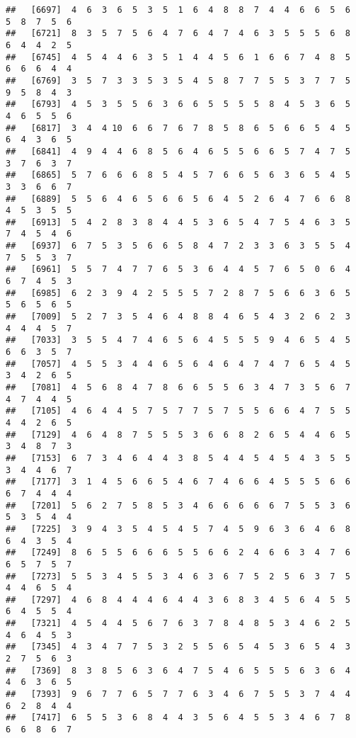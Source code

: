 \documentclass[
]{book}
\begin{document}
\begin{verbatim}
##   [6697]  4  6  3  6  5  3  5  1  6  4  8  8  7  4  4  6  6  5  6  5  8  7  5  6
##   [6721]  8  3  5  7  5  6  4  7  6  4  7  4  6  3  5  5  5  6  8  6  4  4  2  5
##   [6745]  4  5  4  4  6  3  5  1  4  4  5  6  1  6  6  7  4  8  5  6  6  6  4  4
##   [6769]  3  5  7  3  3  5  3  5  4  5  8  7  7  5  5  3  7  7  5  9  5  8  4  3
##   [6793]  4  5  3  5  5  6  3  6  6  5  5  5  5  8  4  5  3  6  5  4  6  5  5  6
##   [6817]  3  4  4 10  6  6  7  6  7  8  5  8  6  5  6  6  5  4  5  6  4  3  6  5
##   [6841]  4  9  4  4  6  8  5  6  4  6  5  5  6  6  5  7  4  7  5  3  7  6  3  7
##   [6865]  5  7  6  6  6  8  5  4  5  7  6  6  5  6  3  6  5  4  5  3  3  6  6  7
##   [6889]  5  5  6  4  6  5  6  6  5  6  4  5  2  6  4  7  6  6  8  4  5  3  5  5
##   [6913]  5  4  2  8  3  8  4  4  5  3  6  5  4  7  5  4  6  3  5  7  4  5  4  6
##   [6937]  6  7  5  3  5  6  6  5  8  4  7  2  3  3  6  3  5  5  4  7  5  5  3  7
##   [6961]  5  5  7  4  7  7  6  5  3  6  4  4  5  7  6  5  0  6  4  6  7  4  5  3
##   [6985]  6  2  3  9  4  2  5  5  5  7  2  8  7  5  6  6  3  6  5  5  6  5  6  5
##   [7009]  5  2  7  3  5  4  6  4  8  8  4  6  5  4  3  2  6  2  3  4  4  4  5  7
##   [7033]  3  5  5  4  7  4  6  5  6  4  5  5  5  9  4  6  5  4  5  6  6  3  5  7
##   [7057]  4  5  5  3  4  4  6  5  6  4  6  4  7  4  7  6  5  4  5  3  4  2  6  5
##   [7081]  4  5  6  8  4  7  8  6  6  5  5  6  3  4  7  3  5  6  7  4  7  4  4  5
##   [7105]  4  6  4  4  5  7  5  7  7  5  7  5  5  6  6  4  7  5  5  4  4  2  6  5
##   [7129]  4  6  4  8  7  5  5  5  3  6  6  8  2  6  5  4  4  6  5  3  4  8  7  3
##   [7153]  6  7  3  4  6  4  4  3  8  5  4  4  5  4  5  4  3  5  5  3  4  4  6  7
##   [7177]  3  1  4  5  6  6  5  4  6  7  4  6  6  4  5  5  5  6  6  6  7  4  4  4
##   [7201]  5  6  2  7  5  8  5  3  4  6  6  6  6  6  7  5  5  3  6  5  3  5  4  4
##   [7225]  3  9  4  3  5  4  5  4  5  7  4  5  9  6  3  6  4  6  8  6  4  3  5  4
##   [7249]  8  6  5  5  6  6  6  5  5  6  6  2  4  6  6  3  4  7  6  6  5  7  5  7
##   [7273]  5  5  3  4  5  5  3  4  6  3  6  7  5  2  5  6  3  7  5  4  4  6  5  4
##   [7297]  4  6  8  4  4  4  6  4  4  3  6  8  3  4  5  6  4  5  5  6  4  5  5  4
##   [7321]  4  5  4  4  5  6  7  6  3  7  8  4  8  5  3  4  6  2  5  4  6  4  5  3
##   [7345]  4  3  4  7  7  5  3  2  5  5  6  5  4  5  3  6  5  4  3  2  7  5  6  3
##   [7369]  8  3  8  5  6  3  6  4  7  5  4  6  5  5  5  6  3  6  4  4  6  3  6  5
##   [7393]  9  6  7  7  6  5  7  7  6  3  4  6  7  5  5  3  7  4  4  6  2  8  4  4
##   [7417]  6  5  5  3  6  8  4  4  3  5  6  4  5  5  3  4  6  7  8  6  6  8  6  7

\end{verbatim}
\end{document}
